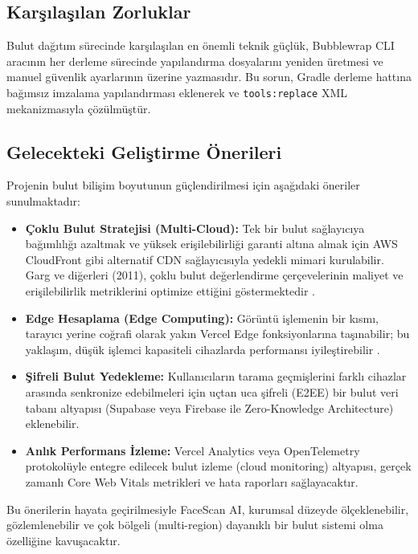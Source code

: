 \subsection{Karşılaşılan Zorluklar}

Bulut dağıtım sürecinde karşılaşılan en önemli teknik güçlük, Bubblewrap CLI aracının her derleme sürecinde yapılandırma dosyalarını yeniden üretmesi ve manuel güvenlik ayarlarının üzerine yazmasıdır. Bu sorun, Gradle derleme hattına bağımsız imzalama yapılandırması eklenerek ve \texttt{tools:replace} XML mekanizmasıyla çözülmüştür.

\subsection{Gelecekteki Geliştirme Önerileri}

Projenin bulut bilişim boyutunun güçlendirilmesi için aşağıdaki öneriler sunulmaktadır:

\begin{itemize}
  \item \textbf{Çoklu Bulut Stratejisi (Multi-Cloud):} Tek bir bulut sağlayıcıya bağımlılığı azaltmak ve yüksek erişilebilirliği garanti altına almak için AWS CloudFront gibi alternatif CDN sağlayıcısıyla yedekli mimari kurulabilir. Garg ve diğerleri (2011), çoklu bulut değerlendirme çerçevelerinin maliyet ve erişilebilirlik metriklerini optimize ettiğini göstermektedir \cite{garg2013smicloud}.

  \item \textbf{Edge Hesaplama (Edge Computing):} Görüntü işlemenin bir kısmı, tarayıcı yerine coğrafi olarak yakın Vercel Edge fonksiyonlarına taşınabilir; bu yaklaşım, düşük işlemci kapasiteli cihazlarda performansı iyileştirebilir \cite{bermbach2017fog}.

  \item \textbf{Şifreli Bulut Yedekleme:} Kullanıcıların tarama geçmişlerini farklı cihazlar arasında senkronize edebilmeleri için uçtan uca şifreli (E2EE) bir bulut veri tabanı altyapısı (Supabase veya Firebase ile Zero-Knowledge Architecture) eklenebilir.

  \item \textbf{Anlık Performans İzleme:} Vercel Analytics veya OpenTelemetry protokolüyle entegre edilecek bulut izleme (cloud monitoring) altyapısı, gerçek zamanlı Core Web Vitals metrikleri ve hata raporları sağlayacaktır.
\end{itemize}

Bu önerilerin hayata geçirilmesiyle FaceScan AI, kurumsal düzeyde ölçeklenebilir, gözlemlenebilir ve çok bölgeli (multi-region) dayanıklı bir bulut sistemi olma özelliğine kavuşacaktır.
